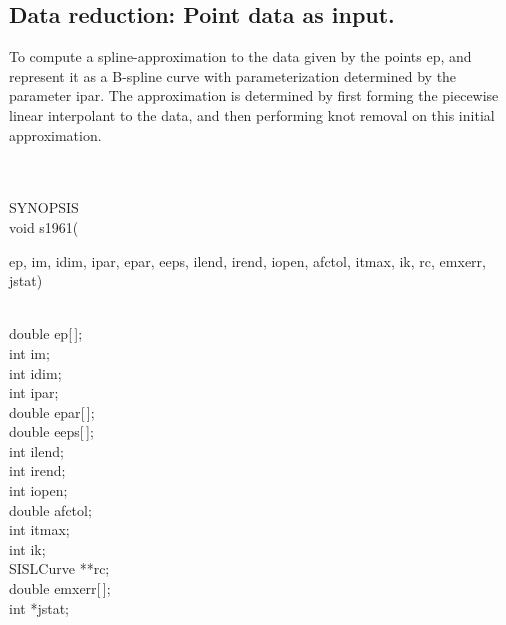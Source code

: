 \subsection{Data reduction: Point data as input.}
\begin{minipg1}
To compute a spline-approximation to the data given by the
           points ep, and represent it as a B-spline curve with
           parameterization determined by the parameter ipar.
           The approximation is determined by first forming the piecewise
           linear interpolant to the data, and then performing knot
           removal on this initial approximation.
\end{minipg1} \\ \\
SYNOPSIS\\
        \> void s1961(\begin{minipg3}
            {\fov ep}, {\fov im}, {\fov idim}, {\fov ipar}, {\fov epar}, {\fov eeps}, {\fov ilend}, {\fov irend}, {\fov iopen}, {\fov afctol},
            {\fov itmax}, {\fov ik}, {\fov rc}, {\fov emxerr}, {\fov jstat})
                \end{minipg3}\\
                \>\>    double \> {\fov ep}[\,];\\
                \>\>    int    \>  {\fov im};\\
                \>\>    int    \>  {\fov idim};\\
                \>\>    int    \>  {\fov ipar};\\
                \>\>    double \> {\fov epar}[\,];\\
                \>\>    double \> {\fov eeps}[\,];\\
                \>\>    int    \>  {\fov ilend};\\
                \>\>    int    \>  {\fov irend};\\
                \>\>    int    \>  {\fov iopen};\\
                \>\>    double \> {\fov afctol};\\
                \>\>    int    \>  {\fov itmax};\\
                \>\>    int    \>  {\fov ik};\\
                \>\>    SISLCurve    \>  **{\fov rc};\\
                \>\>    double \> {\fov emxerr}[\,];\\
                \>\>    int    \>  *{\fov jstat};\\
